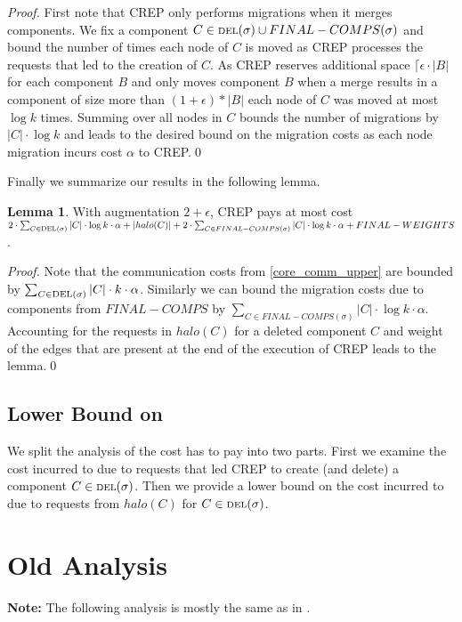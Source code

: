 \documentclass[xcolor=dvipsnames, tikz, 11pt]{article}
\newcommand{\nl}{\newline}
\newcommand{\crep}{C{\scriptsize REP}}
\newcommand{\del}{\text{\scriptsize DEL}}
\newcommand{\opt}{\text{O{\scriptsize PT}}}
\theoremstyle{definition}
\newtheorem{lemma}[defi]{Lemma}
\begin{document}
\textit{Proof.} First note that \crep{} only performs migrations when it merges components.
We fix a component $C\in\del{}(\sigma)\cup FINAL-COMPS(\sigma)$ and bound the number of times each node of $C$ is moved as \crep{} processes the requests that led to the creation of $C$. As \crep{} reserves additional space $\lceil\epsilon\cdot|B|$ for each component $B$ and only moves component $B$ when a merge results in a component of size more than $(1+\epsilon)*|B|$ each node of $C$ was moved at most
$\log k$ times. Summing over all nodes in $C$ bounds the number of migrations by $|C|\cdot\log k$ and leads to the desired bound on the migration costs as each node migration incurs cost $\alpha$ to \crep{}.\qed\nl

Finally we summarize our results in the following lemma.
\begin{lemma}
	\label{crep_upper_bound}
	With augmentation $2+\epsilon$, \crep{} pays at most cost $2\cdot\sum_{C\in\del{}(\sigma)}|C|\cdot\log k\cdot\alpha+|halo(C)|+2\cdot\sum_{C\in FINAL-COMPS(\sigma)}|C|\cdot\log k\cdot\alpha+FINAL-WEIGHTS$.
\end{lemma}
\textit{Proof.} Note that the communication costs from \cref{core_comm_upper} are bounded by $\sum_{C\in\del{}(\sigma)}|C|\cdot k\cdot\alpha$. Similarly we can bound the migration costs due to components from $FINAL-COMPS$ by $\sum_{C\in FINAL-COMPS(\sigma)}|C|\cdot\log k\cdot\alpha$. Accounting for the requests in $halo(C)$ for a deleted component $C$ and weight of the edges that are present at the end of the execution of \crep{} leads to the lemma.\qed


\subsection{Lower Bound on \opt{}}
We split the analysis of the cost \opt{} has to pay into two parts. First we examine the cost incurred to \opt{} due to requests that led \crep{} to create (and delete) a component $C\in\del{}(\sigma)$. Then we provide a lower bound on the cost incurred to \opt{} due to requests from $halo(C)$ for $C\in\del{}(\sigma)$.



\section{Old Analysis}
\textbf{Note:} The following analysis is mostly the same as in \cite{Avin2015}.	
\end{document}
